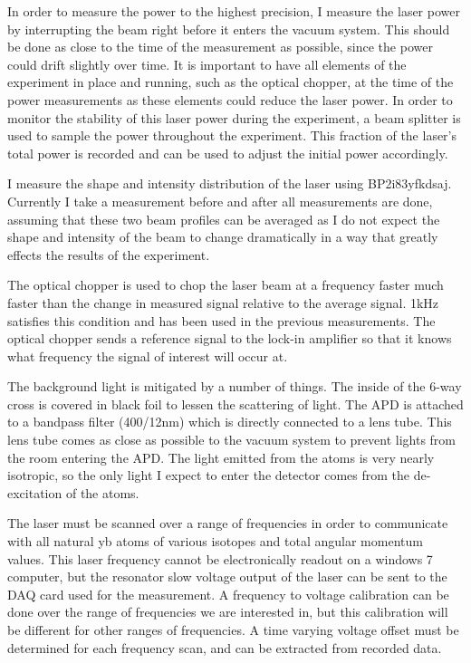 \documentclass[12pt, a4paper]{article}
\begin{document}
In order to measure the power to the highest precision, I measure the laser power by interrupting the beam right before it enters the vacuum system. This should be done as close to the time of the measurement as possible, since the power could drift slightly over time. It is important to have all elements of the experiment in place and running, such as the optical chopper, at the time of the power measurements as these elements could reduce the laser power. In order to monitor the stability of this laser power during the experiment, a beam splitter is used to sample the power throughout the experiment. This fraction of the laser's total power is recorded and can be used to adjust the initial power accordingly.  

I measure the shape and intensity distribution of the laser using BP2i83yfkdsaj. Currently I take a measurement before and after all measurements are done, assuming that these two beam profiles can be averaged as I do not expect the shape and intensity of the beam to change dramatically in a way that greatly effects the results of the experiment.

The optical chopper is used to chop the laser beam at a frequency faster much faster than the change in measured signal relative to the average signal. 1kHz satisfies this condition and has been used in the previous measurements. The optical chopper sends a reference signal to the lock-in amplifier so that it knows what frequency the signal of interest will occur at. 

The background light is mitigated by a number of things. The inside of the 6-way cross is covered in black foil to lessen the scattering of light. The APD is attached to a bandpass filter (400/12nm) which is directly connected to a lens tube. This lens tube comes as close as possible to the vacuum system to prevent lights from the room entering the APD. The light emitted from the atoms is very nearly isotropic, so the only light I expect to enter the detector comes from the de-excitation of the atoms. 

The laser must be scanned over a range of frequencies in order to communicate with all natural yb atoms of various isotopes and total angular momentum values. This laser frequency cannot be electronically readout on a windows 7 computer, but the resonator slow voltage output of the laser can be sent to the DAQ card used for the measurement. A frequency to voltage calibration can be done over the range of frequencies we are interested in, but this calibration will be different for other ranges of frequencies. A time varying voltage offset must be determined for each frequency scan, and can be extracted from recorded data. 
\end{document}
